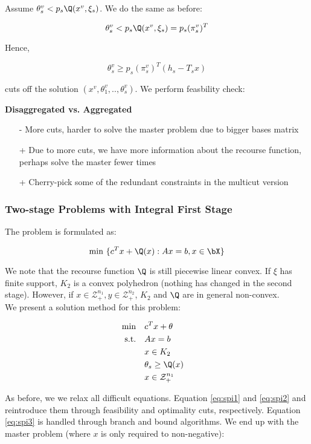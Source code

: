Assume $\theta_s^v < p_s \Q(x^v, \xi_s)$. We do the same as before:

\[
\theta_s^v < p_s \Q(x^v, \xi_s) = p_s (\pi_s^v)^T
\]

Hence,

\[
\theta_s^v \geq p_s (\pi_s^v)^T(h_s - T_s x) 
\]

cuts off the solution $(x^v, \theta_1^v, .., \theta_s^v)$. We perform
feasbility check:

\textbf{Disaggregated vs. Aggregated}

\begin{itemize}
\item[-] More cuts, harder to solve the master problem due to bigger bases matrix
\item[+] Due to more cuts, we have more information about the recourse function, perhaps solve the master fewer times
\item[+] Cherry-pick some of the redundant constraints in the multicut version
\end{itemize}

\subsubsection{Two-stage Problems with Integral First Stage}

The problem is formulated as:

\[
\textrm{min } \{ c^Tx + \Q(x) : Ax=b, x\in \bX \}
\]

We note that the recourse function $\Q$ is still piecewise linear convex. If
$\xi$ has finite support, $K_2$ is a convex polyhedron (nothing has changed
in the second stage).
However, if $x\in \mathcal{Z}_+^{n_1}, y\in \mathcal{Z}_+^{n_2}$, $K_2$ and
$\Q$ are in general non-convex.\\

We present a solution method for this problem:

\begin{alignat}{2}
\textrm{min}  \quad & c^Tx + \theta \\
\textrm{s.t.} \quad & Ax=b & \\
                    & x\in K_2 & \label{eq:spi1} \\
                    & \theta_s \geq \Q(x) & \label{eq:spi2} \\
                    & x\in \mathcal{Z}_+^{n_1} \label{eq:spi3} &
\end{alignat}

As before, we we relax all difficult equations. Equation \ref{eq:spi1} and 
\ref{eq:spi2} and reintroduce them through feasibility and optimality cuts,
respectively. Equation \ref{eq:spi3} is handled through branch and bound algorithms.
We end up with the master problem (where $x$ is only required to
non-negative):

